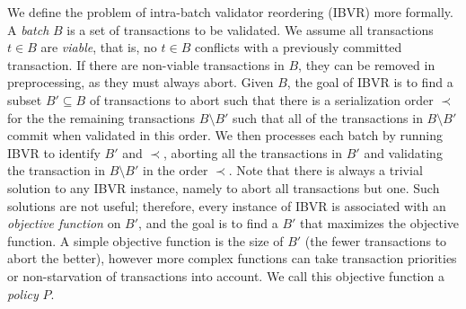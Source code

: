 We define the problem of intra-batch validator reordering (IBVR) more formally. A \emph{batch} $B$ is a set of transactions to be validated. We assume all transactions $t \in B$ are \emph{viable}, that is, no $t \in B$ conflicts with a previously committed transaction. If there are non-viable transactions in $B$, they can be removed in preprocessing, as they must always abort.
Given $B$, the goal of IBVR is to find a subset $B' \subseteq B$ of transactions to abort such that there is a serialization order $\prec$ for the 
the remaining transactions $B \setminus B'$ such that all of the transactions in $B \setminus B'$ commit when validated in this order.
We then processes each batch by running IBVR to identify $B'$ and $\prec$, aborting all the transactions in $B'$  and validating the transaction in $B \setminus B'$  
in the order $\prec$. 
Note that there is always a trivial solution to any IBVR instance, namely to abort all transactions but one. 
Such solutions are not useful; therefore, every instance of
IBVR is associated with an \emph{objective function} on $B'$, and the goal is to
find a $B'$ that maximizes the objective function. A simple objective function
is the size of $B'$ (the fewer transactions to abort the better), however more complex functions can take transaction priorities
or non-starvation of transactions into
account. We call this objective function a \emph{policy} $P$.

